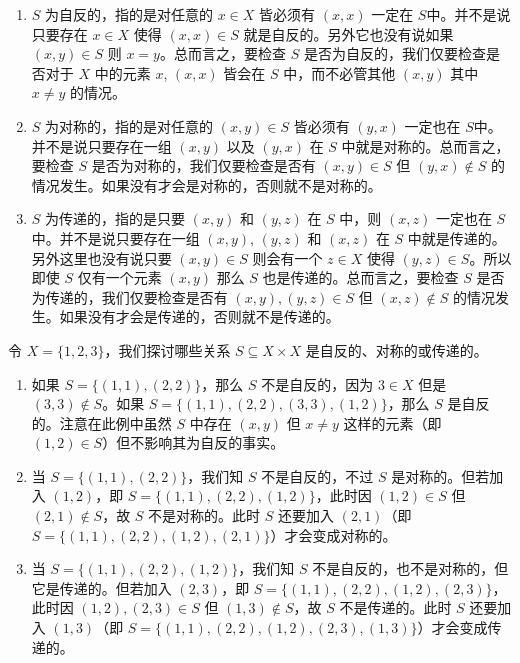 \begin{enumerate}
    \item $S$ 为自反的，指的是对任意的 $x \in X$ 皆必须有 $(x, x)$ 一定在 $S$中。并不是说只要存在 $x \in X$ 使得 $(x, x) \in S$ 就是自反的。另外它也没有说如果 $(x, y) \in S$ 则 $x = y$。总而言之，要检查 $S$ 是否为自反的，我们仅要检查是否对于 $X$ 中的元素 $x$, $(x, x)$ 皆会在 $S$ 中，而不必管其他 $(x, y)$ 其中 $x \neq y$ 的情况。
    \item $S$ 为对称的，指的是对任意的 $(x, y) \in S$ 皆必须有 $(y, x)$ 一定也在 $S$中。并不是说只要存在一组 $(x, y)$ 以及 $(y, x)$ 在 $S$ 中就是对称的。总而言之，要检查 $S$ 是否为对称的，我们仅要检查是否有 $(x, y) \in S$ 但 $(y, x) \notin S$ 的情况发生。如果没有才会是对称的，否则就不是对称的。
    \item $S$ 为传递的，指的是只要 $(x, y)$ 和 $(y, z)$ 在 $S$ 中，则 $(x, z)$ 一定也在 $S$中。并不是说只要存在一组 $(x, y)$, $(y, z)$ 和 $(x, z)$ 在 $S$ 中就是传递的。另外这里也没有说只要 $(x, y) \in S$ 则会有一个 $z \in X$ 使得 $(y, z) \in S$。所以即使 $S$ 仅有一个元素 $(x, y)$ 那么 $S$ 也是传递的。总而言之，要检查 $S$ 是否为传递的，我们仅要检查是否有 $(x, y), (y, z) \in S$ 但 $(x, z) \notin S$ 的情况发生。如果没有才会是传递的，否则就不是传递的。
\end{enumerate}

\begin{example}
令 $X = \{1, 2, 3\}$，我们探讨哪些关系 $S \subseteq X \times X$ 是自反的、对称的或传递的。
\begin{enumerate}
    \item 如果 $S = \{(1, 1), (2, 2)\}$，那么 $S$ 不是自反的，因为 $3 \in X$ 但是 $(3, 3) \notin S$。如果 $S = \{(1, 1), (2, 2), (3, 3), (1, 2)\}$，那么 $S$ 是自反的。注意在此例中虽然 $S$ 中存在 $(x, y)$ 但 $x \neq y$ 这样的元素（即 $(1, 2) \in S$）但不影响其为自反的事实。
    \item 当 $S = \{(1, 1), (2, 2)\}$，我们知 $S$ 不是自反的，不过 $S$ 是对称的。但若加入 $(1, 2)$，即 $S = \{(1, 1), (2, 2), (1, 2)\}$，此时因 $(1, 2) \in S$ 但 $(2, 1) \notin S$，故 $S$ 不是对称的。此时 $S$ 还要加入 $(2, 1)$（即 $S = \{(1, 1), (2, 2), (1, 2), (2, 1)\}$）才会变成对称的。
    \item 当 $S = \{(1, 1), (2, 2), (1, 2)\}$，我们知 $S$ 不是自反的，也不是对称的，但它是传递的。但若加入 $(2, 3)$，即 $S = \{(1, 1), (2, 2), (1, 2), (2, 3)\}$，此时因 $(1, 2), (2, 3) \in S$ 但 $(1, 3) \notin S$，故 $S$ 不是传递的。此时 $S$ 还要加入 $(1, 3)$（即 $S = \{(1, 1), (2, 2), (1, 2), (2, 3), (1, 3)\}$）才会变成传递的。
\end{enumerate}
\end{example}

